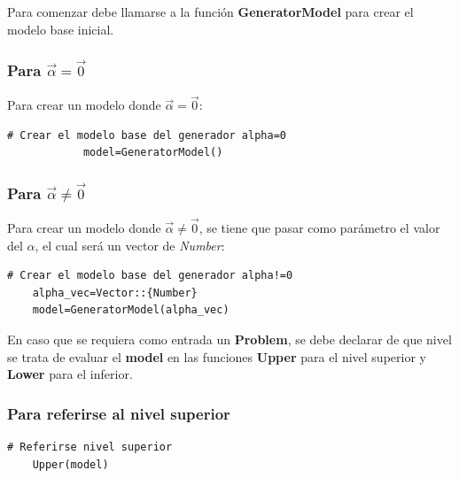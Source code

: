 Para comenzar debe llamarse a la función \textbf{GeneratorModel} para crear el modelo base
inicial.

\subsubsection{Para $\vec{\alpha}=\vec{0}$ }

Para crear un modelo donde $\vec{\alpha}=\vec{0}$:
   
        \begin{lstlisting}[caption={Crear el modelo para $\vec{\alpha}=\vec{0}$}]
            # Crear el modelo base del generador alpha=0
            model=GeneratorModel()
        \end{lstlisting}
        
    
  
%
\subsubsection{Para $\vec{\alpha} \neq \vec{0}$ }

Para crear un modelo donde $\vec{\alpha}\neq \vec{0}$,
se tiene que pasar como parámetro el valor del $\alpha$,
el cual será un vector de \textit{Number}:

\begin{lstlisting}[caption={Crear el modelo para $\vec{\alpha } \neq \vec{0}$}]
    # Crear el modelo base del generador alpha!=0
    alpha_vec=Vector::{Number}
    model=GeneratorModel(alpha_vec)
\end{lstlisting}
%



En caso que se requiera como entrada un \textbf{Problem}, se debe declarar
de que nivel se trata de evaluar el \textbf{model} en las funciones \textbf{Upper} para el nivel 
superior y \textbf{Lower} para el inferior.

\subsubsection{Para referirse al nivel superior}
\begin{lstlisting}[caption={Referirse al nivel superior}]
    # Referirse nivel superior
    Upper(model)
\end{lstlisting}
